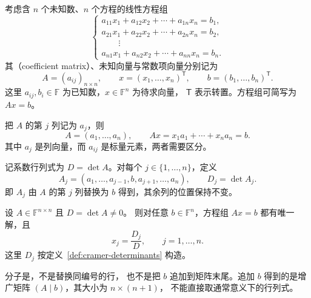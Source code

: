 \documentclass[UTF8,12pt,a4paper,fontset=fandol]{ctexart}
\begin{document}
考虑含 $n$ 个未知数、$n$ 个方程的线性方程组
\begin{equation}
  \begin{cases}
    a_{11}x_1+a_{12}x_2+\cdots+a_{1n}x_n=b_1,\\
    a_{21}x_1+a_{22}x_2+\cdots+a_{2n}x_n=b_2,\\
    \qquad\vdots\\
    a_{n1}x_1+a_{n2}x_2+\cdots+a_{nn}x_n=b_n.
  \end{cases}
  \label{eq:cramer-system}
\end{equation}
其（coefficient matrix）、未知向量与常数项向量分别记为
\[
  A=(a_{ij})_{n\times n},\qquad
  x=(x_1,\ldots,x_n)^{\mathsf T},\qquad
  b=(b_1,\ldots,b_n)^{\mathsf T}.
\]
这里 $a_{ij},b_i\in\mathbb F$ 为已知数，$x\in\mathbb F^n$ 为待求向量，
$\mathsf T$ 表示转置。方程组可简写为 $Ax=b$。

把 $A$ 的第 $j$ 列记为 $a_j$，则
\begin{equation}
  A=(a_1,\ldots,a_n),\qquad
  Ax=x_1a_1+\cdots+x_na_n=b.
  \label{eq:cramer-column-combination}
\end{equation}
其中 $a_j$ 是列向量，而 $a_{ij}$ 是标量元素，两者需要区分。

\begin{definition}[系数行列式与替换列行列式]
\label{def:cramer-determinants}
记系数行列式为 $D=\det A$。对每个 $j\in\{1,\ldots,n\}$，定义
\begin{equation}
  A_j=(a_1,\ldots,a_{j-1},b,a_{j+1},\ldots,a_n),\qquad
  D_j=\det A_j.
  \label{eq:cramer-replacement}
\end{equation}
即 $A_j$ 由 $A$ 的第 $j$ 列替换为 $b$ 得到，其余列的位置保持不变。
\end{definition}

\begin{theorem}[克拉默法则]
\label{thm:cramer}
设 $A\in\mathbb F^{n\times n}$ 且 $D=\det A\ne0$。
则对任意 $b\in\mathbb F^n$，方程组 $Ax=b$ 都有唯一解，且
\begin{equation}
  x_j=\frac{D_j}{D},\qquad j=1,\ldots,n.
  \label{eq:cramer-formula}
\end{equation}
这里 $D_j$ 按定义~\ref{def:cramer-determinants} 构造。
\end{theorem}

分子是，不是替换同编号的行，
也不是把 $b$ 追加到矩阵末尾。追加 $b$ 得到的是增广矩阵 $(A\mid b)$，其大小为 $n\times(n+1)$，
不能直接取通常意义下的行列式。
\end{document}
